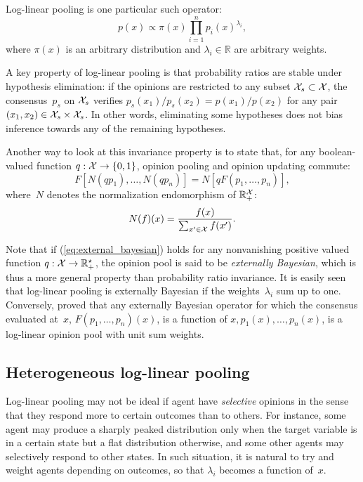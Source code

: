 \documentclass[english]{scrartcl}
\begin{document}
Log-linear pooling \cite{Genest-86} is one particular such operator:
$$
p(x)\propto \pi(x) \prod_{i=1}^n p_i(x)^{\lambda_i},
$$
where $\pi(x)$ is an arbitrary distribution and $\lambda_i\in\mathbb{R}$ are arbitrary weights. 

A key property of log-linear pooling is that probability ratios are stable under hypothesis elimination: if the opinions are restricted to any subset ${\cal X}_s\subset {\cal X}$, the consensus~$p_s$ on ${\cal X}_s$ verifies $p_s(x_1)/p_s(x_2)=p(x_1)/p(x_2)$ for any pair $(x_1,x_2)\in{\cal X}_s\times {\cal X}_s$. In other words, eliminating some hypotheses does not bias inference towards any of the remaining hypotheses.

Another way to look at this invariance property is to state that, for any boolean-valued function $q:{\cal X}\to \{0,1\}$, opinion pooling and opinion updating commute: 
\begin{equation}
\label{eq:external_bayesian}
F[N(q p_1), \ldots, N(q p_n)]
=
N[q F(p_1,\ldots, p_n)],
\end{equation}
where~$N$ denotes the normalization endomorphism of $\mathbb{R}_+^{\cal X}$:
$$
N(f)(x) = \frac{f(x)}{\sum_{x'\in{\cal X}} f(x')}
.
$$

Note that if (\ref{eq:external_bayesian}) holds for any nonvanishing positive valued function $q:{\cal X}\to\mathbb{R}^\star_+$,  the opinion pool is said to be {\em externally Bayesian}, which is thus a more general property than probability ratio invariance. It is easily seen that log-linear pooling is externally Bayesian if the weights~$\lambda_i$ sum up to one. Conversely, \cite{Genest-86b} proved that any externally Bayesian operator for which the consensus evaluated at~$x$, $F(p_1,\ldots,p_n)(x)$, is a function of $x,p_1(x),\ldots,p_n(x)$, is a log-linear opinion pool with unit sum weights. 

\subsection{Heterogeneous log-linear pooling}
\label{app:log_pool_hetero}

Log-linear pooling may not be ideal if agent have {\em selective} opinions in the sense that they respond more to certain outcomes  than to others. For instance, some agent may produce a sharply peaked distribution only when the target variable is in a certain state but a flat distribution otherwise, and some other agents may selectively respond to other states. In such situation, it is natural to try and weight agents depending on outcomes, so that $\lambda_i$ becomes a function of~$x$. 
\end{document}
